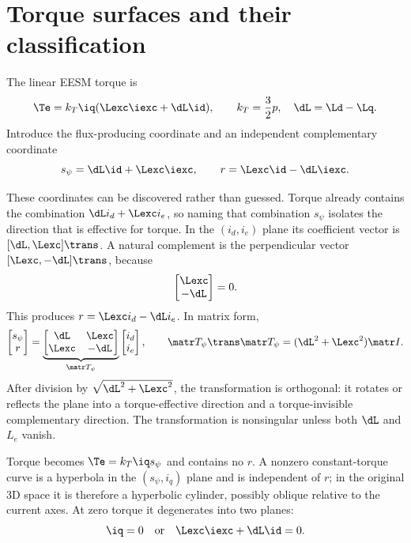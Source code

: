 \section{Torque surfaces and their classification}

The linear EESM torque is
\begin{equation}
 \Te=\kt\iq(\Lexc\iexc+\dL\id),\qquad
 \kt=\frac32p,\quad\dL=\Ld-\Lq.\label{eq:eesm-torque}
\end{equation}
Introduce the flux-producing coordinate and an independent complementary
coordinate
\begin{equation}
 \sflux=\dL\id+\Lexc\iexc,\qquad
 r=\Lexc\id-\dL\iexc.
\end{equation}

These coordinates can be discovered rather than guessed.  Torque already
contains the combination $\dL i_d+\Lexc i_e$, so naming that combination
$s_\psi$ isolates the direction that is effective for torque.  In the
$(i_d,i_e)$ plane its coefficient vector is $[\dL,\Lexc]\trans$.  A natural
complement is the perpendicular vector $[\Lexc,-\dL]\trans$, because
\begin{equation}
 [\dL,\Lexc]\begin{bmatrix}\Lexc\\-\dL\end{bmatrix}=0.
\end{equation}
This produces $r=\Lexc i_d-\dL i_e$.  In matrix form,
\begin{equation}
 \begin{bmatrix}s_\psi\\r\end{bmatrix}
 =
 \underbrace{\begin{bmatrix}\dL&\Lexc\\
                 \Lexc&-\dL\end{bmatrix}}_{\matr T_\psi}
 \begin{bmatrix}i_d\\i_e\end{bmatrix},
 \qquad
 \matr T_\psi\trans\matr T_\psi=(\dL^2+\Lexc^2)\matr I.
\end{equation}
After division by $\sqrt{\dL^2+\Lexc^2}$, the transformation is orthogonal:
it rotates or reflects the plane into a torque-effective direction and a
torque-invisible complementary direction.  The transformation is nonsingular
unless both $\dL$ and $L_e$ vanish.

Torque becomes $\Te=\kt\iq\sflux$ and contains no $r$.  A nonzero
constant-torque curve is a hyperbola in
the $(s_{\psi},i_q)$ plane and is independent of $r$; in the original 3D space
it is therefore a hyperbolic cylinder, possibly oblique relative to the current
axes.  At zero torque it degenerates into two planes:
\begin{equation}
 \iq=0\quad\text{or}\quad\Lexc\iexc+\dL\id=0.
\end{equation}

